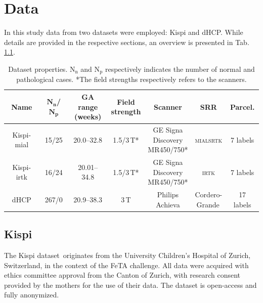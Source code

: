 \chapter{Data} \label{chap:Data}
\vspace{1cm}

In this study data from two datasets were employed: Kispi and dHCP. While details are provided in the respective sections, an overview is presented in Tab.\,\ref{tab:datasets}.
\begin{table}[hbtp]
    \centering
    \begin{tabular}{c|c|c|c|c|c|c}
        \toprule
        \textbf{Name} & $\textbf{N}_\textbf{n}$\textbf{/}$\textbf{N}_\textbf{p}$ & \makecell{\textbf{GA range} \\ \textbf{(weeks)}} & \makecell{\textbf{Field} \\ \textbf{strength}} & \textbf{Scanner} & \textbf{SRR} & \textbf{Parcel.} \\
        \midrule
        Kispi-mial & 15/25 & 20.0--32.8 & 1.5/3\,T* & \makecell{GE Signa \\ Discovery \\ MR450/750*} & \makecell{\textsc{mialsrtk} \\ \cite{Tourbier2015}} & 7 labels \\ \hline
        Kispi-irtk & 16/24 & 20.01--34.8 & 1.5/3\,T* & \makecell{GE Signa \\ Discovery \\ MR450/750*} & \makecell{\textsc{irtk} \\ \cite{Kuklisova2012}} & 7 labels \\ \hline
        dHCP & 267/0 & 20.9--38.3 & 3\,T & \makecell{Philips \\ Achieva} & \makecell{Cordero- \\ Grande\,\cite{CorderoGrande2018}} & 17 labels \\
        \bottomrule
    \end{tabular}
    \caption{Dataset properties. $\text{N}_\text{n}$ and $\text{N}_\text{p}$ respectively indicates the number of normal and pathological cases. *The field strengths respectively refers to the scanners.}
    \label{tab:datasets}
\end{table}

\section{Kispi}
The Kispi dataset\,\cite{Payette2021, FeTA_MICCAI} originates from the University Children's Hospital of Zurich, Switzerland, in the context of the FeTA challenge. All data were acquired with ethics committee approval from the Canton of Zurich, with research consent provided by the mothers for the use of their data. The dataset is open-access and fully anonymized.


